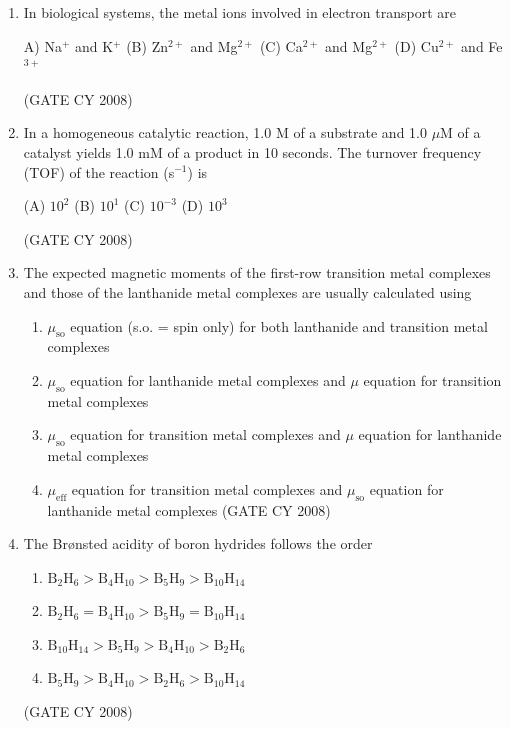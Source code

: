 \documentclass[12pt]{article}
\begin{document}
\begin{enumerate}
\item In biological systems, the metal ions involved in electron transport are
\begin{multicols}{4}
A) Na$^+$ and K$^+$ 
(B) Zn$^{2+}$ and Mg$^{2+}$ 
(C) Ca$^{2+}$ and Mg$^{2+}$ 
(D) Cu$^{2+}$ and Fe$^{3+}$   
\end{multicols}
 \hfill{(GATE CY 2008)}


\item In a homogeneous catalytic reaction, 1.0 M of a substrate and 1.0 $\mu$M of a catalyst yields 1.0 mM of a product in 10 seconds. The turnover frequency (TOF) of the reaction (s$^{-1}$) is
\begin{multicols}{2}
(A) $10^2$ 
(B) $10^1$ 
(C) $10^{-3}$ 
(D) $10^3$    
\end{multicols}   \hfill{(GATE CY 2008)}


\item The expected magnetic moments of the first-row transition metal complexes and those of the lanthanide metal complexes are usually calculated using
\begin{enumerate}
\item  $\mu_{\text{so}}$ equation (s.o. = spin only) for both lanthanide and transition metal complexes
\item  $\mu_{\text{so}}$ equation for lanthanide metal complexes and $\mu$ equation for transition metal complexes
\item  $\mu_{\text{so}}$ equation for transition metal complexes and $\mu$ equation for lanthanide metal complexes
\item  $\mu_{\text{eff}}$ equation for transition metal complexes and $\mu_{\text{so}}$ equation for lanthanide metal complexes    \hfill{(GATE CY 2008)}
\end{enumerate}




\item The Brønsted acidity of boron hydrides follows the order

\begin{enumerate}
    \item[(A)] $\mathrm{B_2H_6 > B_4H_{10} > B_5H_9 > B_{10}H_{14}}$
    \item[(B)] $\mathrm{B_2H_6 = B_4H_{10} > B_5H_9 = B_{10}H_{14}}$
    \item[(C)] $\mathrm{B_{10}H_{14} > B_5H_9 > B_4H_{10} > B_2H_6}$
    \item[(D)] $\mathrm{B_5H_9 > B_4H_{10} > B_2H_6 > B_{10}H_{14}}$
\end{enumerate}  \hfill{(GATE CY 2008)}



\end{enumerate}
\end{document}
